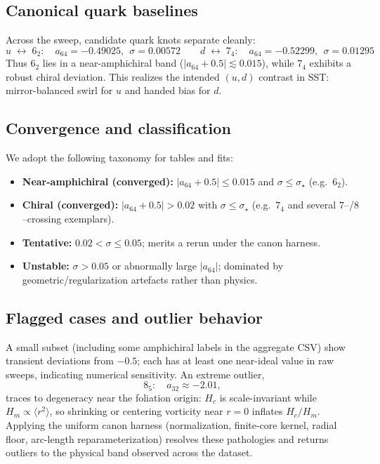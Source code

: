 \documentclass[11pt, preprint,titlepage]{revtex4-2}
\begin{document}
\subsection{Canonical quark baselines}
Across the sweep, candidate quark knots separate cleanly:
\[
\boxed{u\;\leftrightarrow\;6_2:\quad a_{64}=-0.49025,\ \ \sigma=0.00572}
\qquad
\boxed{d\;\leftrightarrow\;7_4:\quad a_{64}=-0.52299,\ \ \sigma=0.01295}
\]
Thus \(6_2\) lies in a near-amphichiral band (\(|a_{64}+0.5|\!\lesssim\!0.015\)), while \(7_4\) exhibits a robust chiral deviation. This realizes the intended \((u,d)\) contrast in SST: mirror-balanced swirl for \(u\) and handed bias for \(d\).

\subsection{Convergence and classification}
We adopt the following taxonomy for tables and fits:
\begin{itemize}
\item \textbf{Near-amphichiral (converged):} \(|a_{64}+0.5|\le 0.015\) and \(\sigma\le\sigma_\star\) (e.g.\ \(6_2\)).
\item \textbf{Chiral (converged):} \(|a_{64}+0.5|>0.02\) with \(\sigma\le\sigma_\star\) (e.g.\ \(7_4\) and several \(7\)–/\(8\)–crossing exemplars).
\item \textbf{Tentative:} \(0.02<\sigma\le 0.05\); merits a rerun under the canon harness.
\item \textbf{Unstable:} \(\sigma>0.05\) or abnormally large \(|a_{64}|\); dominated by geometric/regularization artefacts rather than physics.
\end{itemize}

\subsection{Flagged cases and outlier behavior}
A small subset (including some amphichiral labels in the aggregate CSV) show transient deviations from \(-0.5\); each has at least one near-ideal value in raw sweeps, indicating numerical sensitivity. An extreme outlier,
\[
8_5:\quad a_{32}\approx -2.01,
\]
traces to degeneracy near the foliation origin: \(H_c\) is scale-invariant while \(H_m\propto\langle r^2\rangle\), so shrinking or centering vorticity near \(r=0\) inflates \(H_c/H_m\). Applying the uniform canon harness (normalization, finite-core kernel, radial floor, arc-length reparameterization) resolves these pathologies and returns outliers to the physical band observed across the dataset.
\end{document}

